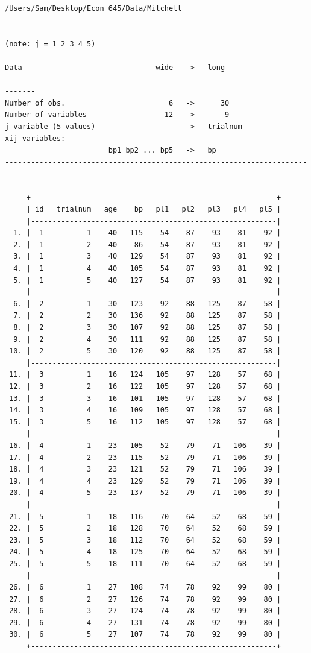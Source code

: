 \documentclass[
]{book}
\begin{document}
\begin{verbatim}
/Users/Sam/Desktop/Econ 645/Data/Mitchell


(note: j = 1 2 3 4 5)

Data                               wide   ->   long
-----------------------------------------------------------------------------
Number of obs.                        6   ->      30
Number of variables                  12   ->       9
j variable (5 values)                     ->   trialnum
xij variables:
                        bp1 bp2 ... bp5   ->   bp
-----------------------------------------------------------------------------

     +---------------------------------------------------------+
     | id   trialnum   age    bp   pl1   pl2   pl3   pl4   pl5 |
     |---------------------------------------------------------|
  1. |  1          1    40   115    54    87    93    81    92 |
  2. |  1          2    40    86    54    87    93    81    92 |
  3. |  1          3    40   129    54    87    93    81    92 |
  4. |  1          4    40   105    54    87    93    81    92 |
  5. |  1          5    40   127    54    87    93    81    92 |
     |---------------------------------------------------------|
  6. |  2          1    30   123    92    88   125    87    58 |
  7. |  2          2    30   136    92    88   125    87    58 |
  8. |  2          3    30   107    92    88   125    87    58 |
  9. |  2          4    30   111    92    88   125    87    58 |
 10. |  2          5    30   120    92    88   125    87    58 |
     |---------------------------------------------------------|
 11. |  3          1    16   124   105    97   128    57    68 |
 12. |  3          2    16   122   105    97   128    57    68 |
 13. |  3          3    16   101   105    97   128    57    68 |
 14. |  3          4    16   109   105    97   128    57    68 |
 15. |  3          5    16   112   105    97   128    57    68 |
     |---------------------------------------------------------|
 16. |  4          1    23   105    52    79    71   106    39 |
 17. |  4          2    23   115    52    79    71   106    39 |
 18. |  4          3    23   121    52    79    71   106    39 |
 19. |  4          4    23   129    52    79    71   106    39 |
 20. |  4          5    23   137    52    79    71   106    39 |
     |---------------------------------------------------------|
 21. |  5          1    18   116    70    64    52    68    59 |
 22. |  5          2    18   128    70    64    52    68    59 |
 23. |  5          3    18   112    70    64    52    68    59 |
 24. |  5          4    18   125    70    64    52    68    59 |
 25. |  5          5    18   111    70    64    52    68    59 |
     |---------------------------------------------------------|
 26. |  6          1    27   108    74    78    92    99    80 |
 27. |  6          2    27   126    74    78    92    99    80 |
 28. |  6          3    27   124    74    78    92    99    80 |
 29. |  6          4    27   131    74    78    92    99    80 |
 30. |  6          5    27   107    74    78    92    99    80 |
     +---------------------------------------------------------+
\end{verbatim}
\end{document}
